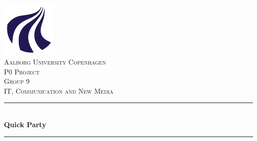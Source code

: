 \documentclass[12p]{article}
\begin{document}
\newcommand{\customparagraph}[1]{\paragraph{#1}\mbox{}\\}

\newcommand{\HRule}{\rule{\linewidth}{0.5mm}} %
\newcommand{\SlimHRule}{\rule{\linewidth}{0.25mm}} %


\begin{titlepage}
    
    \center
    
	
	\includegraphics[width=0.2\textwidth]{pics/AAU_Logo.png}\\[1cm]
    
	
	\textsc{\LARGE Aalborg University Copenhagen}\\[1.5cm]
	
	\textsc{\Large P0 Project}\\[0.5cm]
	
	\textsc{\large Group 9}\\[0.5cm]
	
	\textsc{\large IT, Communication and New Media}\\[0.5cm]
	
	
	
	\HRule\\[0.4cm]
	
	{\huge\bfseries Quick Party}\\[0.4cm]
	
	\HRule\\[1.5cm]
	

\end{titlepage}
\end{document}
